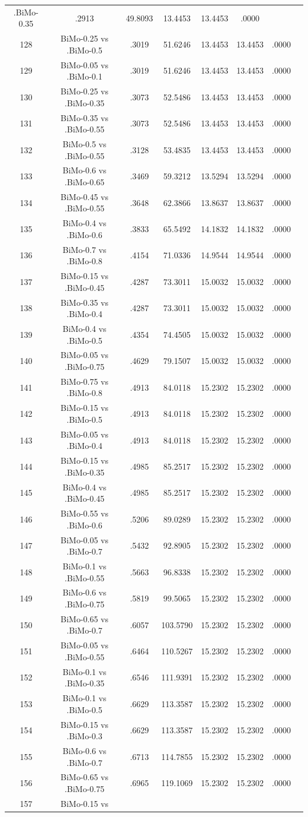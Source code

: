 \documentclass[a4paper,10pt]{article}
\begin{document}
\begin{landscape}
\begin{table}[!htp]
\begin{tabular}{cccccccc}
.BiMo-0.35&.2913&49.8093&13.4453&13.4453&.0000\\128&BiMo-0.25 vs .BiMo-0.5&.3019&51.6246&13.4453&13.4453&.0000\\129&BiMo-0.05 vs .BiMo-0.1&.3019&51.6246&13.4453&13.4453&.0000\\130&BiMo-0.25 vs .BiMo-0.35&.3073&52.5486&13.4453&13.4453&.0000\\131&BiMo-0.35 vs .BiMo-0.55&.3073&52.5486&13.4453&13.4453&.0000\\132&BiMo-0.5 vs .BiMo-0.55&.3128&53.4835&13.4453&13.4453&.0000\\133&BiMo-0.6 vs .BiMo-0.65&.3469&59.3212&13.5294&13.5294&.0000\\134&BiMo-0.45 vs .BiMo-0.55&.3648&62.3866&13.8637&13.8637&.0000\\135&BiMo-0.4 vs .BiMo-0.6&.3833&65.5492&14.1832&14.1832&.0000\\136&BiMo-0.7 vs .BiMo-0.8&.4154&71.0336&14.9544&14.9544&.0000\\137&BiMo-0.15 vs .BiMo-0.45&.4287&73.3011&15.0032&15.0032&.0000\\138&BiMo-0.35 vs .BiMo-0.4&.4287&73.3011&15.0032&15.0032&.0000\\139&BiMo-0.4 vs .BiMo-0.5&.4354&74.4505&15.0032&15.0032&.0000\\140&BiMo-0.05 vs .BiMo-0.75&.4629&79.1507&15.0032&15.0032&.0000\\141&BiMo-0.75 vs .BiMo-0.8&.4913&84.0118&15.2302&15.2302&.0000\\142&BiMo-0.15 vs .BiMo-0.5&.4913&84.0118&15.2302&15.2302&.0000\\143&BiMo-0.05 vs .BiMo-0.4&.4913&84.0118&15.2302&15.2302&.0000\\144&BiMo-0.15 vs .BiMo-0.35&.4985&85.2517&15.2302&15.2302&.0000\\145&BiMo-0.4 vs .BiMo-0.45&.4985&85.2517&15.2302&15.2302&.0000\\146&BiMo-0.55 vs .BiMo-0.6&.5206&89.0289&15.2302&15.2302&.0000\\147&BiMo-0.05 vs .BiMo-0.7&.5432&92.8905&15.2302&15.2302&.0000\\148&BiMo-0.1 vs .BiMo-0.55&.5663&96.8338&15.2302&15.2302&.0000\\149&BiMo-0.6 vs .BiMo-0.75&.5819&99.5065&15.2302&15.2302&.0000\\150&BiMo-0.65 vs .BiMo-0.7&.6057&103.5790&15.2302&15.2302&.0000\\151&BiMo-0.05 vs .BiMo-0.55&.6464&110.5267&15.2302&15.2302&.0000\\152&BiMo-0.1 vs .BiMo-0.35&.6546&111.9391&15.2302&15.2302&.0000\\153&BiMo-0.1 vs .BiMo-0.5&.6629&113.3587&15.2302&15.2302&.0000\\154&BiMo-0.15 vs .BiMo-0.3&.6629&113.3587&15.2302&15.2302&.0000\\155&BiMo-0.6 vs .BiMo-0.7&.6713&114.7855&15.2302&15.2302&.0000\\156&BiMo-0.65 vs .BiMo-0.75&.6965&119.1069&15.2302&15.2302&.0000\\157&BiMo-0.15 vs 
\end{tabular}
\end{table}
\end{landscape}
\end{document}
